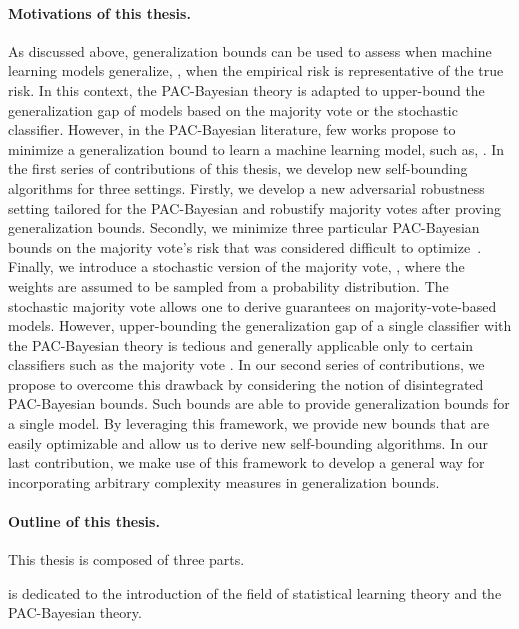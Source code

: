 \paragraph{Motivations of this thesis.}
As discussed above, generalization bounds can be used to assess when machine learning models generalize, \ie, when the empirical risk is representative of the true risk. 
In this context, the PAC-Bayesian theory is adapted to upper-bound the generalization gap of models based on the majority vote or the stochastic classifier. 
However, in the PAC-Bayesian literature, few works propose to minimize a generalization bound to learn a machine learning model, such as, \citet{MasegosaLorenzenIgelSeldin2020}.
In the first series of contributions of this thesis, we develop new self-bounding algorithms for three settings.
Firstly, we develop a new adversarial robustness setting tailored for the PAC-Bayesian and robustify majority votes after proving generalization bounds.
Secondly, we minimize three particular PAC-Bayesian bounds on the majority vote's risk that was considered difficult to optimize~\citep{MasegosaLorenzenIgelSeldin2020}.
Finally, we introduce a stochastic version of the majority vote, \ie, where the weights are assumed to be sampled from a probability distribution.
The stochastic majority vote allows one to derive guarantees on majority-vote-based models. 
However, upper-bounding the generalization gap of a single classifier with the PAC-Bayesian theory is tedious and generally applicable only to certain classifiers such as the majority vote \citep[see \eg,][]{LangfordShaweTaylor2002,GermainLacasseLavioletteMarchand2009,LetarteGermainGuedjLaviolette2019}.
In our second series of contributions, we propose to overcome this drawback by considering the notion of disintegrated PAC-Bayesian bounds.
Such bounds are able to provide generalization bounds for a single model.
By leveraging this framework, we provide new bounds that are easily optimizable and allow us to derive new self-bounding algorithms.
In our last contribution, we make use of this framework to develop a general way for incorporating arbitrary complexity measures in generalization bounds.

\paragraph{Outline of this thesis.} This thesis is composed of three parts.

 is dedicated to the introduction of the field of statistical learning theory and the PAC-Bayesian theory.


